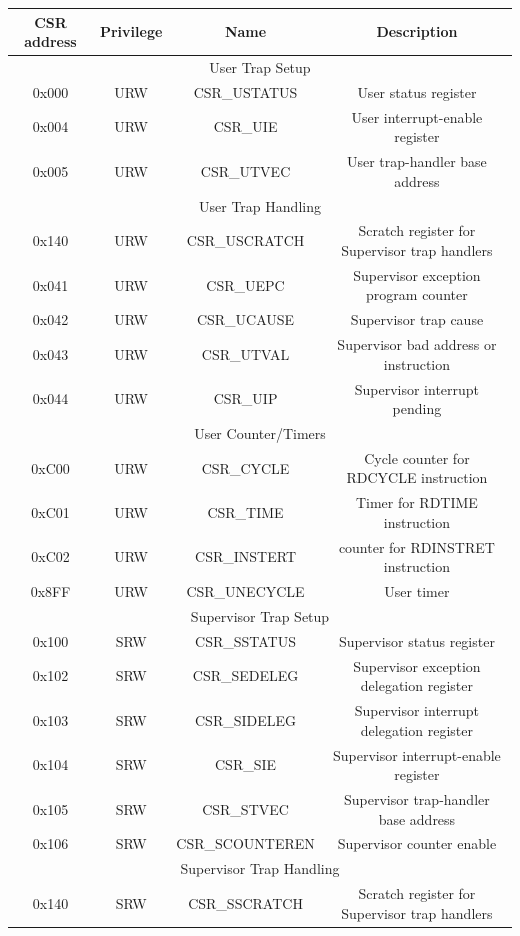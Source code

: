 \documentclass[../main.tex]{subfiles}
\begin{document}
\begin{table}[h!]
\centering

\begin{tabular}{|c|c|c|c|} 
\hline
CSR address & Privilege & Name & Description \\
\hline
\multicolumn{4}{|c|}{User Trap Setup}\\
\hline
0x000 & URW & CSR\_USTATUS & User status register\\
0x004 & URW & CSR\_UIE & User interrupt-enable register\\
0x005 & URW & CSR\_UTVEC & User trap-handler base address\\
\hline
\multicolumn{4}{|c|}{User Trap Handling}\\
\hline
0x140 & URW & CSR\_USCRATCH & Scratch register for Supervisor trap handlers\\
0x041 & URW & CSR\_UEPC & Supervisor exception program counter\\
0x042 & URW & CSR\_UCAUSE & Supervisor trap cause\\
0x043 & URW & CSR\_UTVAL & Supervisor bad address or instruction\\
0x044 & URW & CSR\_UIP & Supervisor interrupt pending\\
\hline
\multicolumn{4}{|c|}{User Counter/Timers}\\
\hline
0xC00 & URW & CSR\_CYCLE & Cycle counter for RDCYCLE instruction\\
0xC01 & URW & CSR\_TIME & Timer for RDTIME instruction\\
0xC02 & URW & CSR\_INSTERT & counter for RDINSTRET instruction\\
0x8FF & URW & CSR\_UNECYCLE & User timer\\
\hline
\multicolumn{4}{|c|}{Supervisor Trap Setup}\\
\hline
0x100 & SRW & CSR\_SSTATUS & Supervisor status register\\
0x102 & SRW & CSR\_SEDELEG & Supervisor exception delegation register\\
0x103 & SRW & CSR\_SIDELEG & Supervisor interrupt delegation register\\
0x104 & SRW & CSR\_SIE & Supervisor interrupt-enable register\\
0x105 & SRW & CSR\_STVEC & Supervisor trap-handler base address\\
0x106 & SRW & CSR\_SCOUNTEREN & Supervisor counter enable\\
\hline
\multicolumn{4}{|c|}{Supervisor Trap Handling}\\
\hline
0x140 & SRW & CSR\_SSCRATCH & Scratch register for Supervisor trap handlers\\

\end{tabular}
\end{table}
\end{document}
